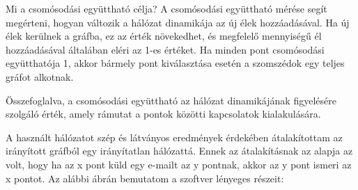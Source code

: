 Mi a csomósodási együttható célja? A csomósodási együttható mérése segít megérteni, hogyan változik a hálózat dinamikája az új élek hozzáadásával. Ha új élek kerülnek a gráfba, ez az érték növekedhet, és megfelelő mennyiségű él hozzáadásával általában eléri az 1-es értéket. Ha minden pont csomósodási együtthatója 1, akkor bármely pont kiválasztása esetén a szomszédok egy teljes gráfot alkotnak.

Összefoglalva, a csomósodási együttható az hálózat dinamikájának figyelésére szolgáló érték, amely rámutat a pontok közötti kapcsolatok kialakulására.

A használt hálózatot szép és látványos eredmények érdekében átalakítottam az irányított gráfból egy irányítatlan hálózattá. Ennek az átalakításnak az alapja az volt, hogy ha az x pont küld egy e-mailt az y pontnak, akkor az y pont ismeri az x pontot. Az alábbi ábrán bemutatom a szoftver lényeges részeit:
